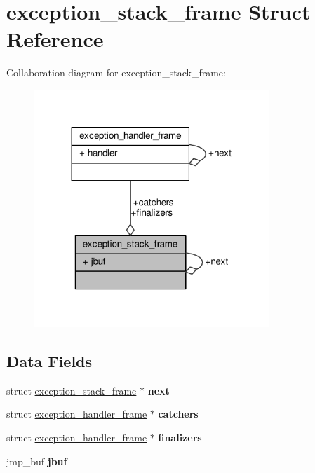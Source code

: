 \hypertarget{structexception__stack__frame}{}\section{exception\+\_\+stack\+\_\+frame Struct Reference}
\label{structexception__stack__frame}


Collaboration diagram for exception\+\_\+stack\+\_\+frame\+:
\nopagebreak
\begin{figure}[H]
\begin{center}
\leavevmode
\includegraphics[width=251pt]{structexception__stack__frame__coll__graph}
\end{center}
\end{figure}
\subsection*{Data Fields}
\begin{DoxyCompactItemize}
\item 
struct \hyperlink{structexception__stack__frame}{exception\+\_\+stack\+\_\+frame} $\ast$ {\bfseries next}\hypertarget{structexception__stack__frame_abb538d9a6f6155ed83f140dd2adb7457}{}\label{structexception__stack__frame_abb538d9a6f6155ed83f140dd2adb7457}

\item 
struct \hyperlink{structexception__handler__frame}{exception\+\_\+handler\+\_\+frame} $\ast$ {\bfseries catchers}\hypertarget{structexception__stack__frame_a950ab78cc930f9662ff9cb7eedcfda79}{}\label{structexception__stack__frame_a950ab78cc930f9662ff9cb7eedcfda79}

\item 
struct \hyperlink{structexception__handler__frame}{exception\+\_\+handler\+\_\+frame} $\ast$ {\bfseries finalizers}\hypertarget{structexception__stack__frame_a543e62e78b4b2777e9df32ccc5feba38}{}\label{structexception__stack__frame_a543e62e78b4b2777e9df32ccc5feba38}

\item 
jmp\+\_\+buf {\bfseries jbuf}\hypertarget{structexception__stack__frame_a6f81386a697bcae78000625ee8ba02fa}{}\label{structexception__stack__frame_a6f81386a697bcae78000625ee8ba02fa}

\end{DoxyCompactItemize}



